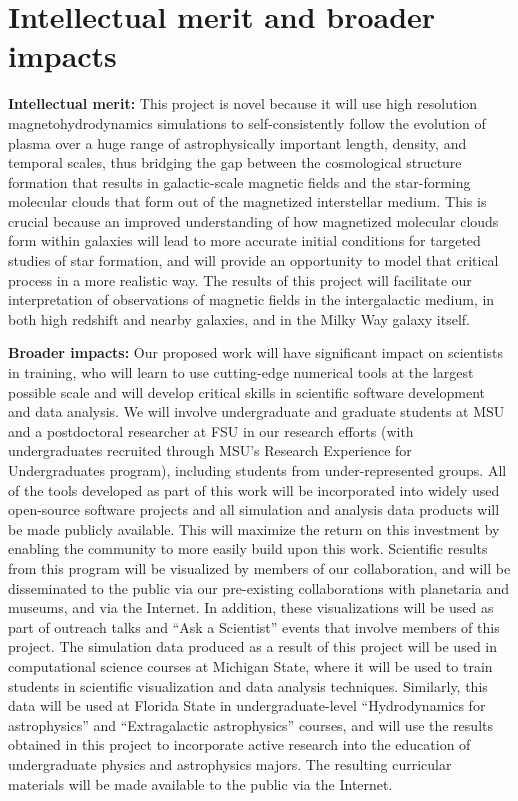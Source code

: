\vspace{-4mm}
\section{Intellectual merit and broader impacts}
\vspace{-3mm}

\textbf{Intellectual merit:} This project is novel because it will use
high resolution magnetohydrodynamics simulations to self-consistently
follow the evolution of plasma over a huge range of astrophysically
important length, density, and temporal scales, thus bridging the gap
between the cosmological structure formation that results in
galactic-scale magnetic fields and the star-forming molecular clouds
that form out of the magnetized interstellar medium.  This is crucial
because an improved understanding of how magnetized molecular clouds
form within galaxies will lead to more accurate initial conditions for
targeted studies of star formation, and will provide an opportunity to
model that critical process in a more realistic way.  The results of
this project will facilitate our interpretation of observations of
magnetic fields in the intergalactic medium, in both high redshift and
nearby galaxies, and in the Milky Way galaxy itself.

\vspace{1mm}

\noindent\textbf{Broader impacts:} Our proposed work will have
significant impact on scientists in training, who will learn to use
cutting-edge numerical tools at the largest possible scale and will develop
critical skills in scientific software development and data analysis.
We will involve undergraduate and graduate students at MSU and a
postdoctoral researcher at FSU in our research efforts (with undergraduates recruited through
MSU's Research Experience for Undergraduates program), including
students from under-represented groups.  All of the tools developed as
part of this work will be incorporated into widely used open-source
software projects and all simulation and analysis data products will
be made publicly available.  This will maximize the return on this
investment by enabling the community to more easily build upon this
work.  Scientific results from this program will be visualized by
members of our collaboration, and will be disseminated to the public
via our pre-existing collaborations with planetaria and museums, and
via the Internet.  In addition, these visualizations will be used as
part of outreach talks and ``Ask a Scientist'' events that involve
members of this project.  The simulation data produced as a result of
this project will be used in computational science courses at Michigan
State, where it will be used to train students in scientific
visualization and data analysis techniques.  Similarly, this data will
be used at Florida State in undergraduate-level ``Hydrodynamics for
astrophysics'' and ``Extragalactic astrophysics'' courses, and will
use the results obtained in this project to incorporate active
research into the education of undergraduate physics and astrophysics
majors.  The resulting curricular materials will be made available to
the public via the Internet.

